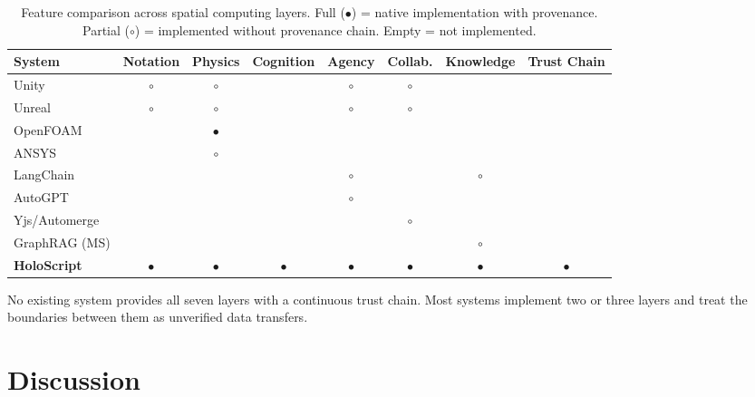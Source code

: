 \documentclass[sigchi-a]{acmart}
\begin{document}
\begin{table}[t]
  \caption{Feature comparison across spatial computing layers. Full
  ($\bullet$) = native implementation with provenance. Partial
  ($\circ$) = implemented without provenance chain. Empty = not
  implemented.}
  \label{tab:related}
  \small
  \begin{tabular}{lccccccc}
    \toprule
    \textbf{System} & \textbf{Notation} & \textbf{Physics} & \textbf{Cognition}
    & \textbf{Agency} & \textbf{Collab.} & \textbf{Knowledge} & \textbf{Trust Chain} \\
    \midrule
    Unity           & $\circ$ & $\circ$ &         & $\circ$ & $\circ$ &         & \\
    Unreal          & $\circ$ & $\circ$ &         & $\circ$ & $\circ$ &         & \\
    OpenFOAM        &         & $\bullet$ &       &         &         &         & \\
    ANSYS           &         & $\circ$ &         &         &         &         & \\
    LangChain       &         &         &         & $\circ$ &         & $\circ$ & \\
    AutoGPT         &         &         &         & $\circ$ &         &         & \\
    Yjs/Automerge   &         &         &         &         & $\circ$ &         & \\
    GraphRAG (MS)   &         &         &         &         &         & $\circ$ & \\
    \textbf{HoloScript}  & $\bullet$ & $\bullet$ & $\bullet$ & $\bullet$ & $\bullet$ & $\bullet$ & $\bullet$ \\
    \bottomrule
  \end{tabular}
\end{table}

No existing system provides all seven layers with a continuous trust chain.
Most systems implement two or three layers and treat the boundaries between
them as unverified data transfers.


\section{Discussion}
\label{sec:discussion}
\end{document}
